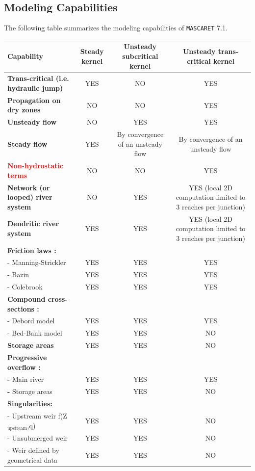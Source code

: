 \documentclass[a4paper,12pt]{article}
\begin{document}
\subsection{Modeling Capabilities}

\hspace{0.5cm}The following table summarizes the modeling capabilities of \texttt{MASCARET} 7.1.

\begin{landscape}

\begin{table}
 
\begin{center}
 
\tiny{

\begin{tabular}{|l|c|c|c|}

\hline 
\textbf{Capability} & \textbf{Steady kernel} & \textbf{Unsteady subcritical kernel} & \textbf{Unsteady trans-critical kernel}\tabularnewline
\hline 
\hline 
\textbf{Trans-critical (i.e. hydraulic jump)} & YES & NO & YES\tabularnewline
\hline 
\textbf{Propagation on dry zones} & NO & NO & YES\tabularnewline
\hline 
\textbf{Unsteady flow} & NO & YES & YES\tabularnewline
\hline 
\textbf{Steady flow} & YES & By convergence of an unsteady flow & By convergence of an unsteady flow\tabularnewline
\hline 
\textbf{\textcolor{red}{Non-hydrostatic terms}} & NO & NO & YES\tabularnewline
\hline 
\textbf{Network (or looped) river system} & NO & YES & YES (local 2D computation limited to 3 reaches per junction)\tabularnewline
\hline 
\textbf{Dendritic river system} & YES & YES & YES (local 2D computation limited to 3 reaches per junction)\tabularnewline
\hline 
\textbf{Friction laws :} &  &  & \tabularnewline
\hline 
- Manning-Strickler & YES & YES & YES\tabularnewline
\hline 
- Bazin & YES & YES & YES\tabularnewline
\hline 
- Colebrook & YES & YES & YES\tabularnewline
\hline 
\textbf{Compound cross-sections :} &  &  & \tabularnewline
\hline 
- Debord model & YES & YES & YES\tabularnewline
\hline 
- Bed-Bank model  & YES & YES & NO\tabularnewline
\hline 
\textbf{Storage areas} & YES & YES & NO\tabularnewline
\hline 
\textbf{Progressive overflow :} &  &  & \tabularnewline
\hline 
\textbf{-} Main river & YES & YES & YES\tabularnewline
\hline 
\textbf{-} Storage areas & YES & YES & NO\tabularnewline
\hline 
\textbf{Singularities: } &  &  & \tabularnewline
\hline 
- Upstream weir f(Z$_{\mbox{upstream}}$,q) & YES & YES & NO\tabularnewline
\hline 
- Unsubmerged weir & YES & YES & NO\tabularnewline
\hline 
- Weir defined by geometrical data & YES & YES & NO\tabularnewline

\end{tabular}}
\end{center}
\end{table}
\end{landscape}
\end{document}
